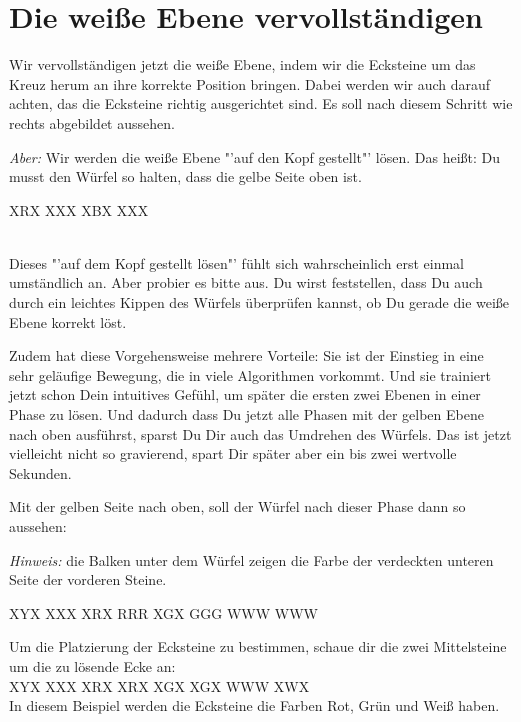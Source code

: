 \section{Die weiße Ebene vervollständigen}
\parbox{0.7\linewidth}{
Wir vervollständigen jetzt die weiße Ebene, indem wir die Ecksteine um das Kreuz herum an ihre korrekte Position bringen.
Dabei werden wir auch darauf achten, das die Ecksteine richtig ausgerichtet sind.
Es soll nach diesem Schritt wie rechts abgebildet aussehen.

\emph{Aber:} Wir werden die weiße Ebene "'auf den Kopf gestellt"' lösen.
Das heißt: Du musst den Würfel so halten, dass die gelbe Seite oben ist.
}\parbox{0.3\linewidth}{
\RubikCubeGreyAll%
%
               {X}{R}{X}
	       {X}{X}{X}%
	       {X}{B}{X}
	       {X}{X}{X}%
}\\[1em]
Dieses "'auf dem Kopf gestellt lösen"' fühlt sich wahrscheinlich erst einmal umständlich an.
Aber probier es bitte aus.
Du wirst feststellen, dass Du auch durch ein leichtes Kippen des Würfels überprüfen kannst, ob Du gerade die weiße Ebene korrekt löst.

Zudem hat diese Vorgehensweise mehrere Vorteile:
Sie ist der Einstieg in eine sehr geläufige Bewegung, die in viele Algorithmen vorkommt.
Und sie trainiert jetzt schon Dein intuitives Gefühl, um später die ersten zwei Ebenen in einer Phase zu lösen.
Und dadurch dass Du jetzt alle Phasen mit der gelben Ebene nach oben ausführst, sparst Du Dir auch das Umdrehen des Würfels.
Das ist jetzt vielleicht nicht so gravierend, spart Dir später aber ein bis zwei wertvolle Sekunden.\\[1em]
\parbox{0.7\linewidth}{
Mit der gelben Seite nach oben, soll der Würfel nach dieser Phase dann so aussehen:

\emph{Hinweis:} die Balken unter dem Würfel zeigen die Farbe der verdeckten unteren Seite der vorderen Steine.
}\parbox{0.3\linewidth}{
\RubikCubeGreyAll%
            {X}{Y}{X}
            {X}{X}{X}%
               {X}{R}{X}
	       {R}{R}{R}%
	       {X}{G}{X}
	       {G}{G}{G}%
	      {W}{W}{W}
	      {W}{W}{W}%
}

\pagebreak
Um die Platzierung der Ecksteine zu bestimmen, schaue dir die zwei Mittelsteine um die zu lösende Ecke an:\\[1em]
\RubikCubeGreyAll%
            {X}{Y}{X}
            {X}{X}{X}%
               {X}{R}{X}
	       {X}{R}{X}%
	       {X}{G}{X}
	       {X}{G}{X}%
	      {W}{W}{W}
	      {X}{W}{X}%
\\[1em]
In diesem Beispiel werden die Ecksteine die Farben Rot, Grün und Weiß haben.

